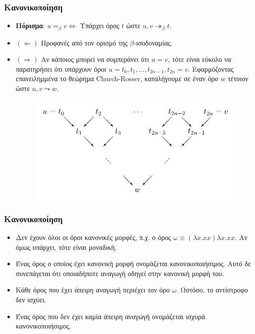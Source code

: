 \documentclass{beamer}
\begin{document}
\begin{frame}
\frametitle{Κανονικοποίηση}
\begin{itemize}
\item \textbf{Πόρισμα}:  $u =_\beta v \Leftrightarrow$ Υπάρχει όρος $t$ ώστε $u, v \twoheadrightarrow _\beta t$.\pause
\item $(\Leftarrow)$ Προφανές από τον ορισμό της $\beta$-ισοδυναμίας.\pause
\item $(\Rightarrow)$ Aν  κάποιος μπορεί να συμπεράνει ότι $u = v$, τότε είναι εύκολο να παρατηρήσει ότι υπάρχουν όροι $u = t_0, t_1,\ldots, t_{2n-1}, t_{2n} = v$. Εφαρμόζοντας επανειλημμένα το θεώρημα Church-Rosser, καταλήγουμε σε έναν όρο	$w$ τέτοιον ώστε $u, v \leadsto w$.\pause
\begin{figure} [!ht]
\centering
\includegraphics[scale=0.3] {CR1.jpg}
\end{figure}
\end{itemize}
\end{frame}

\begin{frame}
\frametitle{Κανονικοποίηση}
\begin{itemize}
\item Δεν έχουν όλοι οι όροι κανονικές μορφές, π.χ. ο όρος $\omega \equiv  (\lambda x . xx) \lambda x . xx$. Αν όμως υπάρχει, τότε είναι μοναδική. \pause
\item Ένας όρος ο οποίος έχει κανονική μορφή ονομάζεται κανονικοποιήσιμος. Αυτό δε συνεπάγεται ότι οποιαδήποτε αναγωγή οδηγεί στην κανονική μορφή του. \pause
\item Κάθε όρος που έχει άπειρη αναγωγή περιέχει τον όρο $\omega$. Ωστόσο, το αντίστροφο δεν ισχύει.\pause
\item Ένας όρος που δεν έχει καμία άπειρη αναγωγή ονομάζεται ισχυρά κανονικοποιήσιμος. 
\end{itemize}
\end{frame}
\end{document}
